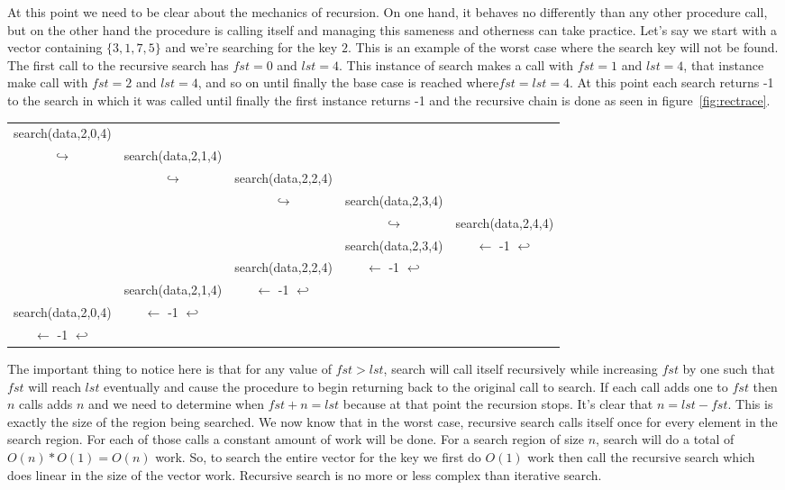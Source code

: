 \documentclass[]{tufte-handout}
\begin{document}
At this point we need to be clear about the mechanics of recursion. On one hand, it behaves no differently than any other procedure call, but on the other hand the procedure is calling itself and managing this sameness and otherness can take practice.  Let's say we start with a vector containing $\{3,1,7,5\}$ and we're searching for the key $2$. This is an example of the worst case where the search key will not be found. The first call to the recursive search has $fst=0$ and $lst=4$. This instance of search makes a call with $fst=1$ and $lst=4$, that instance make call with $fst=2$ and $lst=4$, and so on until finally the base case is reached where$fst=lst=4$. At this point each search returns -1 to the search in which it was called until finally the first instance returns -1 and the recursive chain is done as seen in figure~\ref{fig:rectrace}.

\begin{figure*}[!htbp]
\begin{tabular}{ccccc}
search(data,2,0,4) & & & &  \\
$\hookrightarrow$ & search(data,2,1,4) & & & \\
& $\hookrightarrow$ & search(data,2,2,4) & & \\
&  &  $\hookrightarrow$ & search(data,2,3,4) & \\
& &  &  $\hookrightarrow$ & search(data,2,4,4) \\
& &  & search(data,2,3,4) & $\leftarrow$ -1  $\hookleftarrow$ \\
&  & search(data,2,2,4) & $\leftarrow$ -1  $\hookleftarrow$ & \\
& search(data,2,1,4) & $\leftarrow$ -1  $\hookleftarrow$ & & \\
search(data,2,0,4) &$\leftarrow$ -1  $\hookleftarrow$ & & & \\
$\leftarrow$ -1 $\hookleftarrow$ & & & &
\end{tabular}
\caption{An example sequence of recursive search calls for $data=\{3,1,7,5\}$ }
\label{fig:rectrace}
\end{figure*}

The important thing to notice here is that for any value of $fst > lst$, search will call itself recursively while increasing $fst$ by one such that $fst$ will reach $lst$ eventually and cause the procedure to begin returning back to the original call to search. If each call adds one to $fst$ then $n$ calls adds $n$ and we need to determine when $fst+n=lst$ because at that point the recursion stops. It's clear that $n=lst-fst$. This is exactly the size of the region being searched. We now know that in the worst case, recursive search calls itself once for every element in the search region. For each of those calls a constant amount of work will be done. For a search region of size $n$, search will do a total of $O(n)*O(1)=O(n)$ work. So, to search the entire vector for the key we first do $O(1)$ work then call the recursive search which does linear in the size of the vector work. Recursive search is no more or less complex than iterative search.
\end{document}
